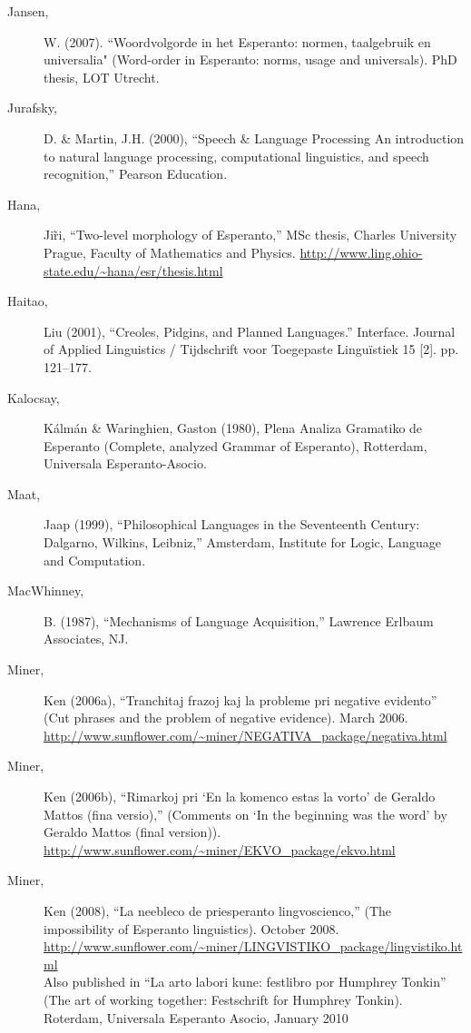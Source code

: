 \documentclass[10pt,a4paper]{article}
\begin{document}
\begin{description}
\item[Jansen,] W. (2007). ``Woordvolgorde in het Esperanto: normen, taalgebruik en
universalia" (Word-order in Esperanto: norms, usage and universals). PhD
thesis, LOT Utrecht.

\item[Jurafsky,] D. \& Martin, J.H. (2000), ``Speech \& Language Processing An
introduction to natural language processing, computational linguistics, and
speech recognition,'' Pearson Education.

\item[Hana,] Ji\~ri, ``Two-level morphology of Esperanto,'' MSc thesis, Charles
University Prague, Faculty of Mathematics and Physics.
\url{http://www.ling.ohio-state.edu/~hana/esr/thesis.html}

\item[Haitao,] Liu (2001), ``Creoles, Pidgins, and Planned Languages.'' Interface.
Journal of Applied Linguistics / Tijdschrift voor Toegepaste Linguïstiek 15 [2]. pp. 121--177.

\item[Kalocsay,] K\'alm\'an \& Waringhien, Gaston (1980), Plena Analiza Gramatiko de
Esperanto (Complete, analyzed Grammar of Esperanto), Rotterdam, Universala
Esperanto-Asocio.

\item[Maat,] Jaap (1999), ``Philosophical Languages in the Seventeenth Century:
Dalgarno, Wilkins, Leibniz,'' Amsterdam, Institute for Logic, Language and
Computation.

\item[MacWhinney,] B. (1987), ``Mechanisms of Language Acquisition,'' Lawrence Erlbaum Associates, NJ.

\item[Miner,] Ken (2006a), ``Tranchitaj frazoj kaj la probleme pri negative
evidento'' (Cut phrases and the problem of negative evidence). March 2006. \\
\url{http://www.sunflower.com/~miner/NEGATIVA_package/negativa.html}

\item[Miner,] Ken (2006b), ``Rimarkoj pri `En la komenco estas la vorto' de Geraldo
Mattos (fina versio),'' (Comments on `In the beginning was the word' by Geraldo
Mattos (final version)). \\
\url{http://www.sunflower.com/~miner/EKVO_package/ekvo.html}

\item[Miner,] Ken (2008), ``La neebleco de priesperanto lingvoscienco,'' (The
impossibility of Esperanto linguistics). October 2008. \\
\url{http://www.sunflower.com/~miner/LINGVISTIKO_package/lingvistiko.html} \\
Also published in ``La arto labori kune: festlibro por Humphrey Tonkin'' (The
art of working together: Festschrift for Humphrey Tonkin). Roterdam, Universala
Esperanto Asocio, January 2010


\end{description}
\end{document}
